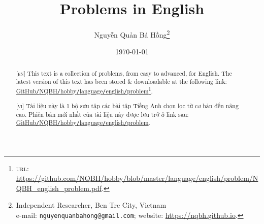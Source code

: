 \documentclass{article}
\title{Problems in English}
\author{Nguyễn Quản Bá Hồng\footnote{Independent Researcher, Ben Tre City, Vietnam\\e-mail: \texttt{nguyenquanbahong@gmail.com}; website: \url{https://nqbh.github.io}.}}
\date{\today}
\numberwithin{equation}{section}
\begin{document}
\maketitle
\begin{abstract}
	\textsc{[en]} This text is a collection of problems, from easy to advanced, for English. The latest version of this text has been stored \& downloadable at the following link: \href{https://github.com/NQBH/hobby/blob/master/language/english/problem/NQBH_english_problem.pdf}{GitHub\texttt{/}NQBH\texttt{/}hobby\texttt{/}language\texttt{/}english\texttt{/}problem}\footnote{\textsc{url}: \url{https://github.com/NQBH/hobby/blob/master/language/english/problem/NQBH_english_problem.pdf}.}.
	\vspace{2mm}
	
	\textsc{[vi]} Tài liệu này là 1 bộ sưu tập các bài tập Tiếng Anh chọn lọc từ cơ bản đến nâng cao. Phiên bản mới nhất của tài liệu này được lưu trữ ở link sau: \href{https://github.com/NQBH/hobby/blob/master/language/english/problem/NQBH_english_problem.pdf}{GitHub\texttt{/}NQBH\texttt{/}hobby\texttt{/}language\texttt{/}english\texttt{/}problem}.
\end{abstract}
\tableofcontents
\newpage

\end{document}
